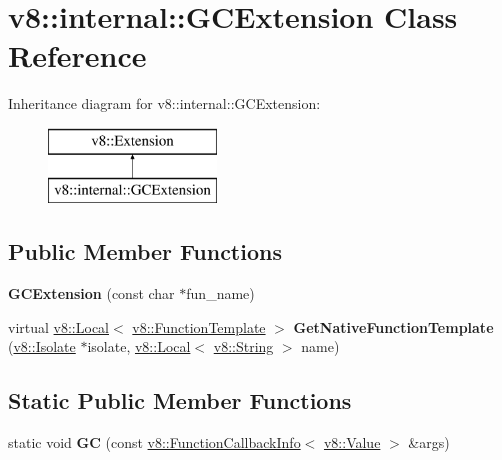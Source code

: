 \hypertarget{classv8_1_1internal_1_1_g_c_extension}{}\section{v8\+:\+:internal\+:\+:G\+C\+Extension Class Reference}
\label{classv8_1_1internal_1_1_g_c_extension}
Inheritance diagram for v8\+:\+:internal\+:\+:G\+C\+Extension\+:\begin{figure}[H]
\begin{center}
\leavevmode
\includegraphics[height=2.000000cm]{classv8_1_1internal_1_1_g_c_extension}
\end{center}
\end{figure}
\subsection*{Public Member Functions}
\begin{DoxyCompactItemize}
\item 
{\bfseries G\+C\+Extension} (const char $\ast$fun\+\_\+name)\hypertarget{classv8_1_1internal_1_1_g_c_extension_af3965f1917f026783534231cac88788f}{}\label{classv8_1_1internal_1_1_g_c_extension_af3965f1917f026783534231cac88788f}

\item 
virtual \hyperlink{classv8_1_1_local}{v8\+::\+Local}$<$ \hyperlink{classv8_1_1_function_template}{v8\+::\+Function\+Template} $>$ {\bfseries Get\+Native\+Function\+Template} (\hyperlink{classv8_1_1_isolate}{v8\+::\+Isolate} $\ast$isolate, \hyperlink{classv8_1_1_local}{v8\+::\+Local}$<$ \hyperlink{classv8_1_1_string}{v8\+::\+String} $>$ name)\hypertarget{classv8_1_1internal_1_1_g_c_extension_ad98d897c6340a883ee781d9e8b44e62c}{}\label{classv8_1_1internal_1_1_g_c_extension_ad98d897c6340a883ee781d9e8b44e62c}

\end{DoxyCompactItemize}
\subsection*{Static Public Member Functions}
\begin{DoxyCompactItemize}
\item 
static void {\bfseries GC} (const \hyperlink{classv8_1_1_function_callback_info}{v8\+::\+Function\+Callback\+Info}$<$ \hyperlink{classv8_1_1_value}{v8\+::\+Value} $>$ \&args)\hypertarget{classv8_1_1internal_1_1_g_c_extension_aa8fedc733aba5b2784fc6e97d191931e}{}\label{classv8_1_1internal_1_1_g_c_extension_aa8fedc733aba5b2784fc6e97d191931e}

\end{DoxyCompactItemize}
